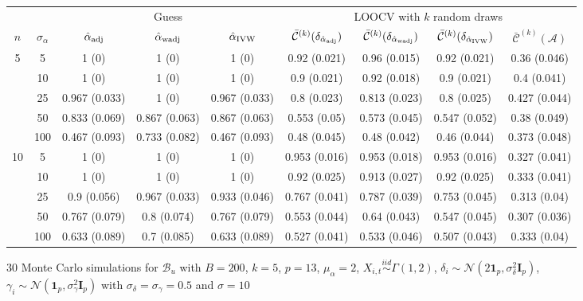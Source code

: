 \documentclass[10pt]{article}
\newcommand{\simiid}{\stackrel{iid}{\sim}} %
\def\normal#1#2{\mathcal{N}(#1,#2)} %
\def\mc#1{\mathcal{#1}} %
\theoremstyle{definition}
\begin{document}


\begin{sidewaysfigure}
\centering
\caption{30 Monte Carlo simulations  for $\mc{B}_u$ with $B = 200$, $k = 5$, $p = 13$, $\mu_{\alpha}=2$, $X_{i,t} \simiid \Gamma(1,2)$, $\delta_i \sim \normal{2\mathbf{1}_p}{\sigma^2_{\delta}\mathbf{I}_p}$, $\gamma_i \sim \normal{\mathbf{1}_p}{\sigma^2_{\gamma}\mathbf{I}_p}$ with $\sigma_{\delta}=\sigma_{\gamma}=0.5$ and $\sigma = 10$}
\begin{tabular}{cc|ccc|cccc}
   &   & \multicolumn{3}{|c|}{Guess} & \multicolumn{4}{|c}{LOOCV with $k$ random draws}  \\ 
 $n$   & $\sigma_{\alpha}$ &  $\hat{\alpha}_{\rm adj}$  & $\hat{\alpha}_{\rm wadj}$ & $\hat{\alpha}_{\rm IVW}$  & $\bar{\mc{C}}^{(k)}(\delta_{\hat{\alpha}_{\rm adj}})$  & $\bar{\mc{C}}^{(k)}(\delta_{\hat{\alpha}_{\rm wadj}})$ & $\bar{\mc{C}}^{(k)}(\delta_{\hat{\alpha}_{\rm IVW}})$ &  $\bar{\mc{C}}^{(k)}(\mc{A})$ \\[.3cm]  
  \hline
  \multirow{5}{*}{5} & 5  & 1 (0) & 1 (0) & 1 (0) & 0.92 (0.021) & 0.96 (0.015) & 0.92 (0.021) & 0.36 (0.046) \\ 
    & 10  & 1 (0) & 1 (0) & 1 (0) & 0.9 (0.021) & 0.92 (0.018) & 0.9 (0.021) & 0.4 (0.041) \\ 
    & 25  & 0.967 (0.033) & 1 (0) & 0.967 (0.033) & 0.8 (0.023) & 0.813 (0.023) & 0.8 (0.025) & 0.427 (0.044) \\ 
    & 50  & 0.833 (0.069) & 0.867 (0.063) & 0.867 (0.063) & 0.553 (0.05) & 0.573 (0.045) & 0.547 (0.052) & 0.38 (0.049) \\ 
    & 100  & 0.467 (0.093) & 0.733 (0.082) & 0.467 (0.093) & 0.48 (0.045) & 0.48 (0.042) & 0.46 (0.044) & 0.373 (0.048) \\[.3cm] 
    \multirow{5}{*}{10} & 5  & 1 (0) & 1 (0) & 1 (0) & 0.953 (0.016) & 0.953 (0.018) & 0.953 (0.016) & 0.327 (0.041) \\ 
    & 10  & 1 (0) & 1 (0) & 1 (0) & 0.92 (0.025) & 0.913 (0.027) & 0.92 (0.025) & 0.333 (0.041) \\ 
    & 25  & 0.9 (0.056) & 0.967 (0.033) & 0.933 (0.046) & 0.767 (0.041) & 0.787 (0.039) & 0.753 (0.045) & 0.313 (0.04) \\ 
    & 50  & 0.767 (0.079) & 0.8 (0.074) & 0.767 (0.079) & 0.553 (0.044) & 0.64 (0.043) & 0.547 (0.045) & 0.307 (0.036) \\ 
    & 100  & 0.633 (0.089) & 0.7 (0.085) & 0.633 (0.089) & 0.527 (0.041) & 0.533 (0.046) & 0.507 (0.043) & 0.333 (0.04) \\[.3cm] 

\end{tabular}
\end{sidewaysfigure}
\end{document}
